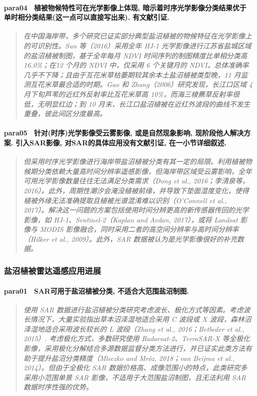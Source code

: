 \paragraph*{para04~
    \textcolor[RGB]{17, 205, 29}{植被物候特性可在光学影像上体现, 暗示着时序光学影像分类结果优于单时相分类结果(这一点可以直接写出来). 有文献引证.}}
\begin{quotation}
    \itshape
    在中国海岸带，多个研究已证实部分典型盐沼植被的物候特征在光学影像上的可识别性。Sun 等（2016）采用全年 HJ-1 光学影像进行江苏省盐城区域的盐沼植被制图，基于全年每月 NDVI 时间序列的制图精度比单相分类高 16.0\%；在12 个月的 NDVI 中，仅采用 6 个关键月的 NDVI，总体准确率几乎不下降；且由于互花米草枯萎期较其余本土盐沼植被类型晚，11 月监测互花米草最合适的时期。Gao 和 Zhang（2006）研究发现，长江口区域 4 月下旬芦苇的近红外反射率比互花米草高 10\%，而海三棱藨草反射率很低，无明显红边；到 10 月末，长江口盐沼植被在近红外波段的曲线不发生重叠，彼此间区分度最高。 
\end{quotation}

\paragraph*{para05~
    \textcolor[RGB]{17, 205, 29}{针对(时序)光学影像受云雾影像, 或是自然现象影响, 现阶段他人解决方案. 引入SAR影像, 对SAR的具体应用没有文献引证, 在一小节详细叙述.}}
\begin{quotation}
    \itshape
    但采用时序光学影像进行海岸带盐沼植被分类有其一定的局限。利用植被物候期分类依赖大量高时间分辨率遥感影像，但海岸带区域受云雾影响，全年可用光学影像数量往往无法满足分类需求（Dong et al., 2016；李清泉等，2016）。此外，周期性潮汐会淹没植被前缘，并导致下垫面湿度变化，使得植被外缘无法准确提取且植被光谱混淆难以识别（O’Connell et al., 2017）。解决这一问题的方案包括使用时间分辨更高的新传感器传回的光学影像，如 HJ-1、Sentinel-2（Kaplan and  Avdan,  2017），或将 Landsat 影像与 MODIS 影像融合，同时采用二者的高空间分辨率与高时间分辨率（Hilker et al., 2009）。此外，SAR 数据被认为是光学影像很好的补充数据。 
\end{quotation}

\subsubsection{盐沼植被雷达遥感应用进展}
\paragraph*{para01~
    \textcolor[RGB]{17, 205, 29}{SAR可用于盐沼植被分类, 不适合大范围盐沼制图.}}
\begin{quotation}
    \itshape
    使用 SAR 数据进行盐沼植被分类研究考虑波长、极化方式等因素。考虑波长情况下，大量实验指出草本沼泽湿地适合采用 C 波段或 X 波段，森林沼泽湿地适合采用波长较长的 L 波段（Zhang et al., 2016；Betbeder et al., 2015）. 考虑极化方式，多数研究使用 Radarsat-2、TerraSAR-X 等全极化影像，采用极化分解结合多源数据监督分类方法进行，并已证实此类方法有助于提升盐沼分类精度（Mleczko and Mróz, 2018；van Beijma et al., 2014）。但由于全极化 SAR 数据价格高、成像范围小的特点，此类研究多采用小范围单景 SAR 影像，不适用于大范围盐沼制图，且无法利用 SAR 数据时序性强的优势。 

\end{quotation}

